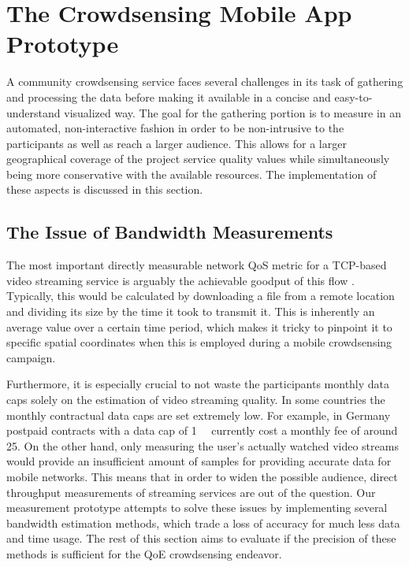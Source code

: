 \section{The Crowdsensing Mobile App Prototype}
\label{sec:prototype}

A community crowdsensing service faces several challenges in its task of gathering and processing the data before making it available in a concise and easy-to-understand visualized way. The goal for the gathering portion is to measure in an automated, non-interactive fashion in order to be non-intrusive to the participants as well as reach a larger audience. This allows for a larger geographical coverage of the project service quality values while simultaneously being more conservative with the available resources. The implementation of these aspects is discussed in this section.


\subsection{The Issue of Bandwidth Measurements}
\label{sec:BWest}

The most important directly measurable network \gls{QoS} metric for a \acrshort{TCP}-based %
 video streaming service is arguably the achievable goodput of this flow%
. Typically, this would be calculated by downloading a file from a remote location and dividing its size by the time it took to transmit it. This is inherently an average value over a certain time period, which makes it tricky to pinpoint it to specific spatial coordinates when this is employed during a mobile crowdsensing campaign.

Furthermore, it is especially crucial to not waste the participants monthly data caps solely on the estimation of video streaming quality. In some countries the monthly contractual data caps are set extremely low. For example, in Germany postpaid contracts with a data cap of \SI{1}{\giga\byte} currently cost a monthly fee of around \SI{25}{\EUR}. On the other hand, only measuring the user's actually watched video streams would provide an insufficient amount of samples for providing accurate data for mobile networks. This means that in order to widen the possible audience, direct throughput measurements of streaming services are out of the question. Our measurement prototype attempts to solve these issues by implementing several bandwidth estimation methods, which trade a loss of accuracy for much less data and time usage. The rest of this section aims to evaluate if the precision of these methods is sufficient for the \gls{QoE} crowdsensing endeavor.


